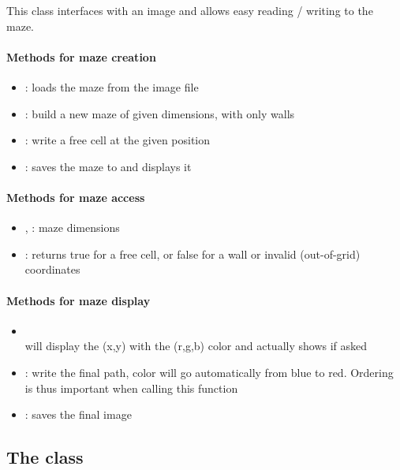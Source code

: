 \documentclass{ecnreport}
\begin{document}
This class interfaces with an image and allows easy reading / writing to the maze. 

\paragraph{Methods for maze creation}
\begin{itemize}
 \item {}: loads the maze from the image file
 \item {}: build a new maze of given dimensions, with only walls
 \item {}: write a free cell at the given position
 \item {}: saves the maze to  and displays it
\end{itemize}

\paragraph{Methods for maze access}
\begin{itemize}
 \item {}, : maze dimensions
 \item {}: returns true for a free cell, or false for a wall or invalid (out-of-grid) coordinates
\end{itemize}

\paragraph{Methods for maze display}
\begin{itemize}
 \item {}\\
    will display the (x,y) with the (r,g,b) color and actually shows if asked
 \item {}: write the final path, color will go automatically from blue to red. 
 Ordering is thus important when calling this function
 \item {}: saves the final image
\end{itemize}

\subsection{The  class}\label{ptClass}
\end{document}
